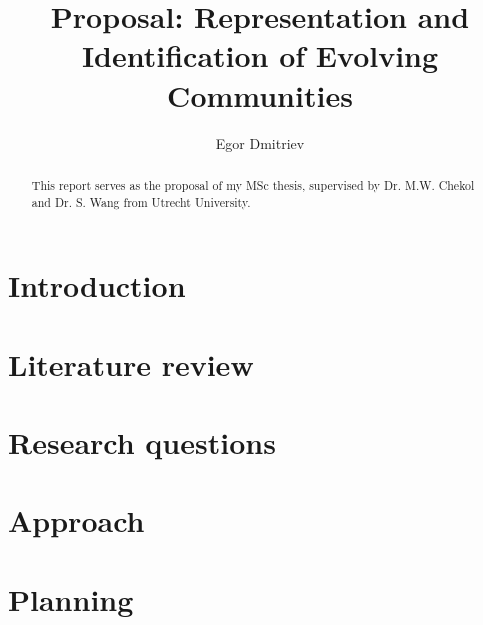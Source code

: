 \documentclass[acmconf,nonacm]{acmart}
\begin{document}
\title{Proposal: Representation and Identification of Evolving Communities}

\author{Egor Dmitriev}

\begin{abstract}
This report serves as the proposal of my MSc thesis, 
supervised by Dr. M.W. Chekol and Dr. S. Wang from Utrecht University.
\end{abstract}

\maketitle

\section{Introduction}

\section{Literature review}

\section{Research questions}

\section{Approach}

\section{Planning}
\end{document}
